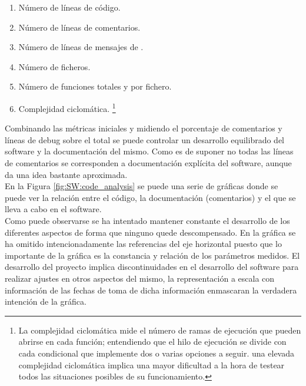     \begin{enumerate}
        \item Número de líneas de código.
        \item Número de líneas de comentarios.
        \item Número de líneas de mensajes de .
        \item Número de ficheros.
        \item Número de funciones totales y por fichero.
        \item Complejidad ciclomática. \footnote{La complejidad ciclomática mide el número de ramas de ejecución que pueden abrirse en cada función; entendiendo que el hilo de ejecución se divide con cada condicional que implemente dos o varias opciones a seguir. una elevada complejidad ciclomática implica una mayor dificultad a la hora de testear todos las situaciones posibles de su funcionamiento.}
    \end{enumerate}

    Combinando las métricas iniciales y midiendo el porcentaje de comentarios y líneas de debug sobre el total se puede controlar un desarrollo equilibrado del software y la documentación del mismo. Como es de suponer no todas las líneas de comentarios se corresponden a documentación explícita del software, aunque da una idea bastante aproximada.
    \\
    
    En la Figura \ref{fig:SW:code_analysis} se puede una serie de gráficas donde se puede ver la relación entre el código, la documentación (comentarios) y el  que se lleva a cabo en el software.
    \\
    
    Como puede observarse se ha intentado mantener constante el desarrollo de los diferentes aspectos de forma que ninguno quede descompensado. En la gráfica se ha omitido intencionadamente las referencias del eje horizontal puesto que lo importante de la gráfica es la constancia y relación de los parámetros medidos. El desarrollo del proyecto implica discontinuidades en el desarrollo del software para realizar ajustes en otros aspectos del mismo, la representación a escala con información de las fechas de toma de dicha información enmascaran la verdadera intención de la gráfica.

